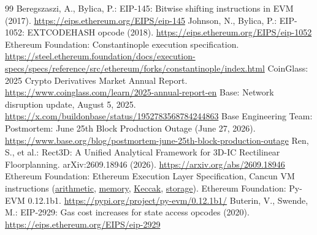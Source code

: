 \documentclass[runningheads]{llncs}
\begin{document}
\begin{thebibliography}{99}
 Beregszaszi, A., Bylica, P.: EIP-145: Bitwise shifting instructions in EVM (2017). \url{https://eips.ethereum.org/EIPS/eip-145}
 Johnson, N., Bylica, P.: EIP-1052: EXTCODEHASH opcode (2018). \url{https://eips.ethereum.org/EIPS/eip-1052}
 Ethereum Foundation: Constantinople execution specification. \url{https://steel.ethereum.foundation/docs/execution-specs/specs/reference/src/ethereum/forks/constantinople/index.html}
 CoinGlass: 2025 Crypto Derivatives Market Annual Report. \url{https://www.coinglass.com/learn/2025-annual-report-en}
 Base: Network disruption update, August 5, 2025. \url{https://x.com/buildonbase/status/1952783568784244863}
 Base Engineering Team: Postmortem: June 25th Block Production Outage (June 27, 2026). \url{https://www.base.org/blog/postmortem-june-25th-block-production-outage}
 Ren, S., et al.: Rect3D: A Unified Analytical Framework for 3D-IC Rectilinear Floorplanning. arXiv:2609.18946 (2026). \url{https://arxiv.org/abs/2609.18946}
 Ethereum Foundation: Ethereum Execution Layer Specification, Cancun VM instructions (\href{https://ethereum.github.io/execution-specs/src/ethereum/forks/cancun/vm/instructions/arithmetic.py.html}{arithmetic}, \href{https://ethereum.github.io/execution-specs/src/ethereum/forks/cancun/vm/instructions/memory.py.html}{memory}, \href{https://ethereum.github.io/execution-specs/src/ethereum/forks/cancun/vm/instructions/keccak.py.html}{Keccak}, \href{https://ethereum.github.io/execution-specs/src/ethereum/forks/cancun/vm/instructions/storage.py.html}{storage}).
 Ethereum Foundation: Py-EVM 0.12.1b1. \url{https://pypi.org/project/py-evm/0.12.1b1/}
 Buterin, V., Swende, M.: EIP-2929: Gas cost increases for state access opcodes (2020). \url{https://eips.ethereum.org/EIPS/eip-2929}
\end{thebibliography}
\end{document}
